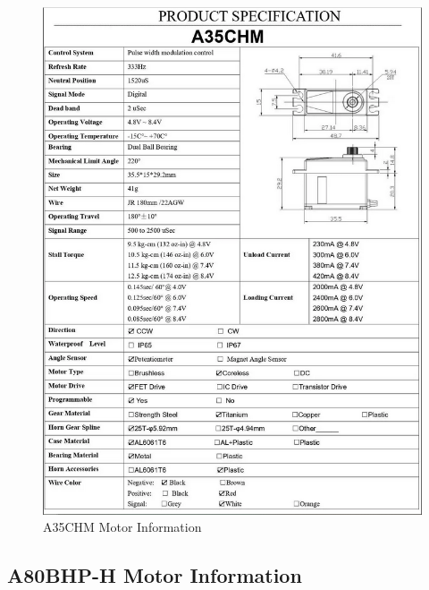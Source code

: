 \begin{figure}[H]
    \centering
    \includegraphics[width=\textwidth]{Images/A35CHM_info.png}
    \caption{A35CHM Motor Information}
    \label{fig:A35CHM_info}
\end{figure}

\subsection{A80BHP-H Motor Information}
\label{appendix:A80_motor_info}

